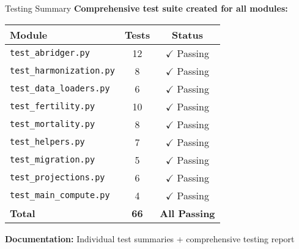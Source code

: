 \documentclass[aspectratio=169]{beamer}
\begin{document}
\begin{frame}{Testing Summary}
\textbf{Comprehensive test suite created for all modules:}

\begin{table}
\small
\begin{tabular}{lcc}
\toprule
\textbf{Module} & \textbf{Tests} & \textbf{Status} \\
\midrule
\texttt{test\_abridger.py} & 12 & \textcolor{successgreen}{$\checkmark$ Passing} \\
\texttt{test\_harmonization.py} & 8 & \textcolor{successgreen}{$\checkmark$ Passing} \\
\texttt{test\_data\_loaders.py} & 6 & \textcolor{successgreen}{$\checkmark$ Passing} \\
\texttt{test\_fertility.py} & 10 & \textcolor{successgreen}{$\checkmark$ Passing} \\
\texttt{test\_mortality.py} & 8 & \textcolor{successgreen}{$\checkmark$ Passing} \\
\texttt{test\_helpers.py} & 7 & \textcolor{successgreen}{$\checkmark$ Passing} \\
\texttt{test\_migration.py} & 5 & \textcolor{successgreen}{$\checkmark$ Passing} \\
\texttt{test\_projections.py} & 6 & \textcolor{successgreen}{$\checkmark$ Passing} \\
\texttt{test\_main\_compute.py} & 4 & \textcolor{successgreen}{$\checkmark$ Passing} \\
\midrule
\textbf{Total} & \textbf{66} & \textcolor{successgreen}{\textbf{All Passing}} \\
\bottomrule
\end{tabular}
\end{table}

\textbf{Documentation:} Individual test summaries + comprehensive testing report
\end{frame}
\end{document}
